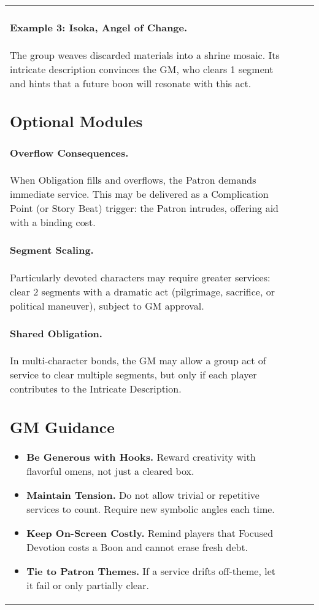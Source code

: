 \begin{longtable}{@{}p{3.3cm}p{3.3cm}p{4.6cm}p{7.2cm}@{}}
\paragraph{Example 3: Isoka, Angel of Change.} The group weaves discarded materials into a shrine mosaic. Its intricate description convinces the GM, who clears 1 segment and hints that a future boon will resonate with this act.

\subsection{Optional Modules}\label{subsec:obligation-modules}
\paragraph{Overflow Consequences.} When Obligation fills and overflows, the Patron demands immediate service. This may be delivered as a Complication Point (or Story Beat) trigger: the Patron intrudes, offering aid with a binding cost.\index{Overflow}
\paragraph{Segment Scaling.} Particularly devoted characters may require greater services: clear 2 segments with a dramatic act (pilgrimage, sacrifice, or political maneuver), subject to GM approval.
\paragraph{Shared Obligation.} In multi-character bonds, the GM may allow a group act of service to clear multiple segments, but only if each player contributes to the Intricate Description.

\subsection{GM Guidance}\label{subsec:obligation-gm}
\begin{itemize}
\item \textbf{Be Generous with Hooks.} Reward creativity with flavorful omens, not just a cleared box.
\item \textbf{Maintain Tension.} Do not allow trivial or repetitive services to count. Require new symbolic angles each time.
\item \textbf{Keep On-Screen Costly.} Remind players that Focused Devotion costs a Boon and cannot erase fresh debt.
\item \textbf{Tie to Patron Themes.} If a service drifts off-theme, let it fail or only partially clear.
\end{itemize}


\end{longtable}
